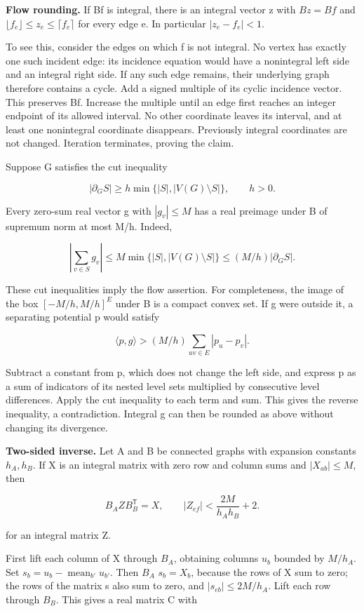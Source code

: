 \documentclass[english,11pt,a4paper]{article}
\begin{document}
\textbf{Flow rounding.} If Bf is integral, there is an integral vector z with \(Bz=Bf\) and \(\lfloor f_e\rfloor\le z_e\le\lceil f_e\rceil\) for every edge e. In particular \(|z_{e}-f_{e}|<1\).

To see this, consider the edges on which f is not integral. No vertex has exactly one such incident edge: its incidence equation would have a nonintegral left side and an integral right side. If any such edge remains, their underlying graph therefore contains a cycle. Add a signed multiple of its cyclic incidence vector. This preserves Bf. Increase the multiple until an edge first reaches an integer endpoint of its allowed interval. No other coordinate leaves its interval, and at least one nonintegral coordinate disappears. Previously integral coordinates are not changed. Iteration terminates, proving the claim.

Suppose G satisfies the cut inequality

\[|\partial_G S|\ge h\min\{|S|,|V(G)\setminus S|\},\qquad h>0.\tag{F.1}\]

Every zero-sum real vector g with \(|g_{v}|\le M\) has a real preimage under B of supremum norm at most M/h. Indeed,

\[\left|\sum_{v\in S}g_v\right|\le M\min\{|S|,|V(G)\setminus S|\}\le(M/h)|\partial_G S|.\]

These cut inequalities imply the flow assertion. For completeness, the image of the box \([-M/h,M/h]^E\) under B is a compact convex set. If g were outside it, a separating potential p would satisfy

\[\langle p,g\rangle>(M/h)\sum_{uv\in E}|p_u-p_v|.\]

Subtract a constant from p, which does not change the left side, and express p as a sum of indicators of its nested level sets multiplied by consecutive level differences. Apply the cut inequality to each term and sum. This gives the reverse inequality, a contradiction. Integral g can then be rounded as above without changing its divergence.

\textbf{Two-sided inverse.} Let A and B be connected graphs with expansion constants \(h_{A},h_{B}\). If X is an integral matrix with zero row and column sums and \(|X_{ab}|\le M\), then

\[B_A Z B_B^{\mathsf T}=X,\qquad |Z_{ef}|<\frac{2M}{h_Ah_B}+2.\tag{F.2}\]

for an integral matrix Z.

First lift each column of X through \(B_{A}\), obtaining columns \(u_{b}\) bounded by \(M/h_{A}\). Set \(s_b=u_b-\operatorname{mean}_{b\prime}u_{b\prime}\). Then \(B_{A}\) \(s_{b}=X_{b}\), because the rows of X sum to zero; the rows of the matrix s also sum to zero, and \(|s_{eb}|\le 2M/h_{A}\). Lift each row through \(B_{B}\). This gives a real matrix C with
\end{document}
